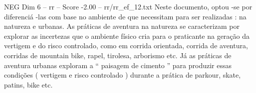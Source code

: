 \begin{textsample}{NEG Dim 6 – rr – Score -2.00 – rr/rr\_ef\_12.txt}
Neste documento, optou -se por diferenciá -las com base no ambiente de que necessitam para ser realizadas : na natureza e urbanas.
As práticas de aventura na natureza se caracterizam por explorar as incertezas que o ambiente físico cria para o praticante na geração da vertigem e do risco controlado, como em corrida orientada, corrida de aventura, corridas de mountain bike, rapel, tirolesa, arborismo etc.
Já as práticas de aventura urbanas exploram a “ paisagem de cimento ” para produzir essas condições ( vertigem e risco controlado ) durante a prática de parkour, skate, patins, bike etc.

\end{textsample}
